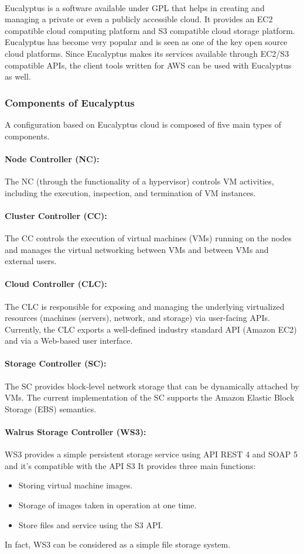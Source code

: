 \paragraph{}Eucalyptus is a software available under GPL that helps in creating and managing a private or even a publicly accessible cloud.
 It provides an EC2 compatible cloud computing platform and S3 compatible cloud storage platform. 
Eucalyptus has become very popular and is seen as one of the key open source cloud platforms.
 Since Eucalyptus makes its services available through EC2/S3 compatible APIs, the client tools written for AWS can be used with Eucalyptus as well.
\subsubsection{Components of Eucalyptus}
A configuration based on Eucalyptus cloud is composed of five main types of components.

\paragraph{Node Controller (NC):}The NC (through the functionality of a hypervisor) controls VM activities,
 including the execution, inspection, and termination of VM instances.
\paragraph{Cluster Controller (CC):}
The CC controls the execution of virtual machines (VMs) running on the nodes and manages the virtual networking between VMs and between VMs and external users.
\paragraph{Cloud Controller (CLC):}The CLC is responsible for exposing and managing the underlying virtualized resources (machines (servers),
 network, and storage) via user-facing APIs. 
Currently, the CLC exports a well-defined industry standard API (Amazon EC2) and via a Web-based user interface.
\paragraph{Storage Controller (SC):}The SC provides block-level network storage that can be dynamically attached by VMs. 
The current implementation of the SC supports the Amazon Elastic Block Storage (EBS) semantics.
\paragraph{ Walrus Storage Controller (WS3):}WS3 provides a simple persistent storage service using API REST 4 and SOAP 5 and it's compatible with the API S3
It provides three main functions:
\begin{itemize}
 \item Storing virtual machine images.
 \item Storage of images taken in operation at one time.
 \item Store files and service using the S3 API.
\end{itemize}
In fact, WS3 can be considered as a simple file storage system.

